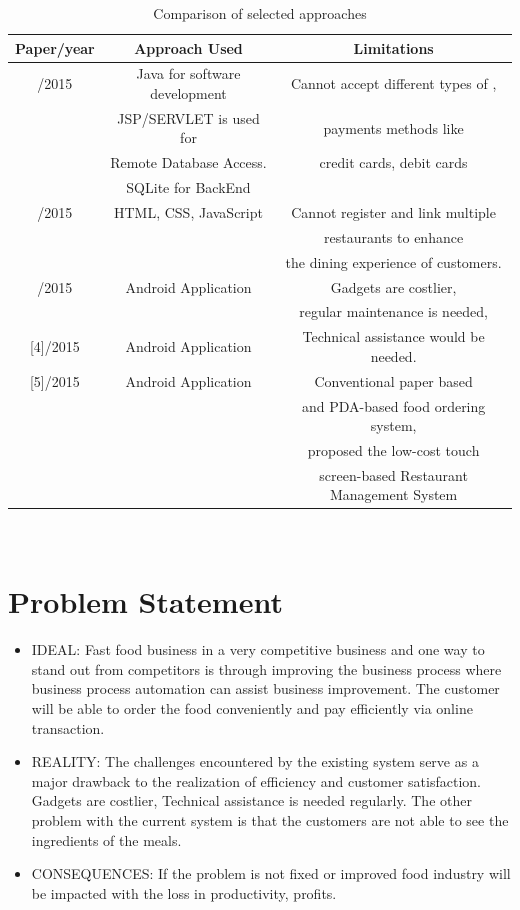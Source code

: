 \documentclass[english]{article}
\begin{document}
\begin{table}[ht]
\centering

\begin{tabular}{ ||c|c|c| } \hline
\centering

\textbf{Paper/year} &  \textbf{Approach Used} &\textbf{Limitations} 
                   \\  \hline
[1]/2015  & Java for software development   &  Cannot accept different types of , \\
 & JSP/SERVLET is used for  & payments methods like \\  
 &  Remote Database Access. &credit cards, debit cards\\  
 & SQLite for BackEnd &\\ \hline 
[2]/2015  & HTML, CSS, JavaScript & Cannot register and link multiple \\
 & &restaurants to enhance\\
&& the dining experience of customers. \\ \hline 
[3]/2015  & Android Application  & Gadgets are costlier, \\
&& regular maintenance is needed, \\ \hline

[4]/2015  & Android Application  & Technical assistance would be needed. \\ \hline 

[5]/2015 &Android Application & Conventional paper based \\
  &  &and PDA-based food ordering system,\\
  & &proposed the low-cost touch \\
  & &screen-based Restaurant Management System \\ \hline 
\end{tabular} \\
\caption{Comparison of selected approaches}
\end{table}%

\clearpage %
\section{Problem Statement} %
\begin{itemize}
\item IDEAL: Fast food business in a very competitive business
and one way to stand out from competitors is through improving the business process where
business process automation can assist business improvement. The customer will be able to order the food conveniently and pay efficiently via online transaction.
\item REALITY: The challenges encountered by the existing system serve as a major drawback to the realization of efficiency and customer satisfaction. Gadgets are costlier, Technical assistance is needed regularly. The other problem with the
current system is that the customers are not able to see the ingredients of the meals.
\item  CONSEQUENCES: If the problem is not fixed or improved food industry will be impacted with the loss in productivity, profits.
\end{itemize}
\end{document}
